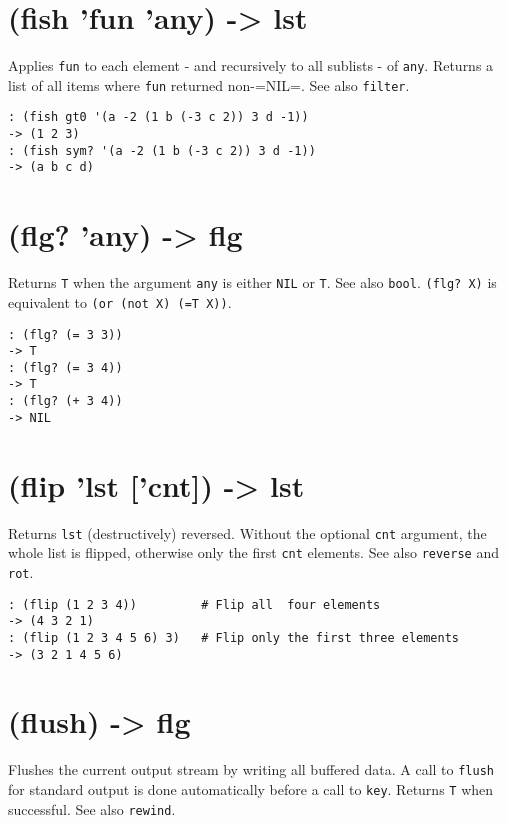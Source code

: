 {{{{{{ 
\section{(fish 'fun 'any) -> lst}
\label{sec-8-1-6-13}


Applies \texttt{fun} to each element - and recursively to all sublists - of
\texttt{any}. Returns a list of all items where \texttt{fun} returned non-=NIL=. See
also \texttt{filter}.


\begin{verbatim}
: (fish gt0 '(a -2 (1 b (-3 c 2)) 3 d -1))
-> (1 2 3)
: (fish sym? '(a -2 (1 b (-3 c 2)) 3 d -1))
-> (a b c d)
\end{verbatim}

 
\section{(flg? 'any) -> flg}
\label{sec-8-1-6-14}


Returns \texttt{T} when the argument \texttt{any} is either \texttt{NIL} or \texttt{T}. See also
\texttt{bool}. \texttt{(flg? X)} is equivalent to \texttt{(or (not X) (=T X))}.


\begin{verbatim}
: (flg? (= 3 3))
-> T
: (flg? (= 3 4))
-> T
: (flg? (+ 3 4))
-> NIL
\end{verbatim}

 
\section{(flip 'lst ['cnt]) -> lst}
\label{sec-8-1-6-15}


Returns \texttt{lst} (destructively) reversed. Without the optional \texttt{cnt}
argument, the whole list is flipped, otherwise only the first \texttt{cnt}
elements. See also \texttt{reverse} and \texttt{rot}.


\begin{verbatim}
: (flip (1 2 3 4))         # Flip all  four elements
-> (4 3 2 1)
: (flip (1 2 3 4 5 6) 3)   # Flip only the first three elements
-> (3 2 1 4 5 6)
\end{verbatim}

 
\section{(flush) -> flg}
\label{sec-8-1-6-16}


Flushes the current output stream by writing all buffered data. A call
to \texttt{flush} for standard output is done automatically before a call to
\texttt{key}. Returns \texttt{T} when successful. See also \texttt{rewind}.


}}}}}}
